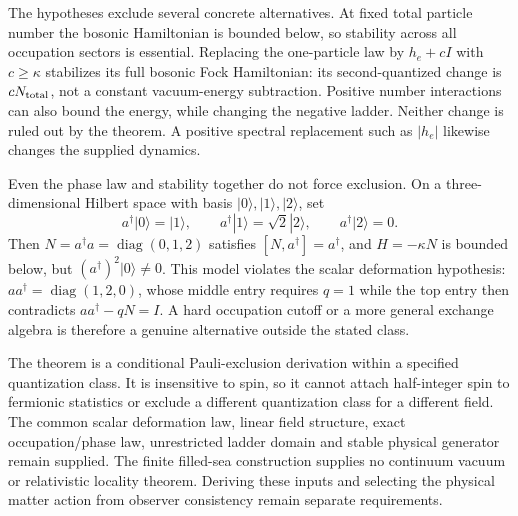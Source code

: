 The hypotheses exclude several concrete alternatives. At fixed total
particle number the bosonic Hamiltonian is bounded below, so stability
across all occupation sectors is essential. Replacing the one-particle
law by $h_e+cI$ with $c\geq\kappa$ stabilizes its full bosonic Fock
Hamiltonian: its second-quantized change is $cN_{\rm total}$, not a
constant vacuum-energy subtraction. Positive number interactions can
also bound the energy, while changing the negative ladder. Neither
change is ruled out by the theorem. A positive spectral replacement
such as $|h_e|$ likewise changes the supplied dynamics.

Even the phase law and stability together do not force exclusion.
On a three-dimensional Hilbert space with basis $|0\rangle,|1\rangle,
|2\rangle$, set
\[
 a^\dagger|0\rangle=|1\rangle,\qquad
 a^\dagger|1\rangle=\sqrt2|2\rangle,\qquad
 a^\dagger|2\rangle=0.
\]
Then $N=a^\dagger a=\operatorname{diag}(0,1,2)$ satisfies
$[N,a^\dagger]=a^\dagger$, and $H=-\kappa N$ is bounded below,
but $(a^\dagger)^2|0\rangle\ne0$. This model violates the scalar
deformation hypothesis: $aa^\dagger=\operatorname{diag}(1,2,0)$,
whose middle entry requires $q=1$ while the top entry then contradicts
$aa^\dagger-qN=I$. A hard occupation cutoff or a more general exchange
algebra is therefore a genuine alternative outside the stated class.

The theorem is a conditional Pauli-exclusion derivation within a specified
quantization class. It is insensitive to spin, so it cannot attach
half-integer spin to fermionic statistics or exclude a different
quantization class for a different field. The common scalar deformation
law, linear field structure, exact occupation/phase law, unrestricted
ladder domain and stable physical generator remain supplied. The finite
filled-sea construction supplies no continuum vacuum or relativistic
locality theorem. Deriving these inputs and selecting the physical
matter action from observer consistency remain separate requirements.
